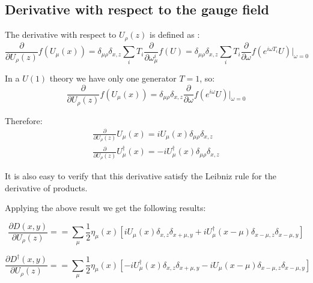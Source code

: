 \documentclass[12pt, a4paper]{article}
\begin{document}
\subsection{Derivative with respect to the gauge field}

The derivative with respect to $U_{\rho}(z)$ is defined as \cite{gattringer2009quantum}:
%
\begin{equation}
\frac{\partial }{\partial U_{\rho}(z)} f(U_\mu(x))
= \delta_{\mu \rho} \delta_{x, z} \sum_i T_i \frac{\partial}{\partial \omega_{\mu}^{i}} f(U)
=  \delta_{\mu \rho} \delta_{x, z}  \sum_i T_i \frac{\partial}{\partial \omega} 
f( e^{i \omega T_i} U)\big\vert_{\omega=0}
\end{equation}

In a $U(1)$ theory we have only one generator $T=1$, so:
\begin{equation}
\frac{\partial }{\partial U_{\rho}(z)} f(U_{\mu}(x))
=  \delta_{\mu \rho} \delta_{x, z}  \frac{\partial}{\partial \omega} f( e^{i \omega} U)\big\vert_{\omega=0}
\end{equation}

Therefore:
\begin{align}
\frac{\partial }{\partial U_{\rho}(z)} U_{\mu}(x) = 
i U_{\mu}(x) \delta_{\mu \rho} \delta_{x, z}
\\
\frac{\partial }{\partial U_{\rho}(z)} U^\dagger_{\mu}(x) = 
-i U^\dagger_{\mu}(x) \delta_{\mu \rho} \delta_{x, z}
\end{align}

It is also easy to verify that this derivative satisfy the Leibniz rule for the derivative of products.

Applying the above result we get the following results:

\begin{equation}
\frac{\partial D(x,y)}{\partial U_{\rho}(z)} =  
=  \sum_{\mu} \frac{1}{2} \eta_{\mu}(x) 
    [i U_{\mu}(x) \delta_{x,z} \delta_{x+\mu, y}
     + i U^{\dagger}_{\mu}(x-\mu) \delta_{x-\mu,z} \delta_{x-\mu, y} ]
\end{equation}

\begin{equation}
\frac{\partial D^{\dagger}(x,y)}{\partial U_{\rho}(z)} =  
=  \sum_{\mu} \frac{1}{2} \eta_{\mu}(x) 
    [-i U^{\dagger}_{\mu}(x) \delta_{x,z} \delta_{x+\mu, y}
     - i U_{\mu}(x-\mu) \delta_{x-\mu,z} \delta_{x-\mu, y} ]
\end{equation}
\end{document}
